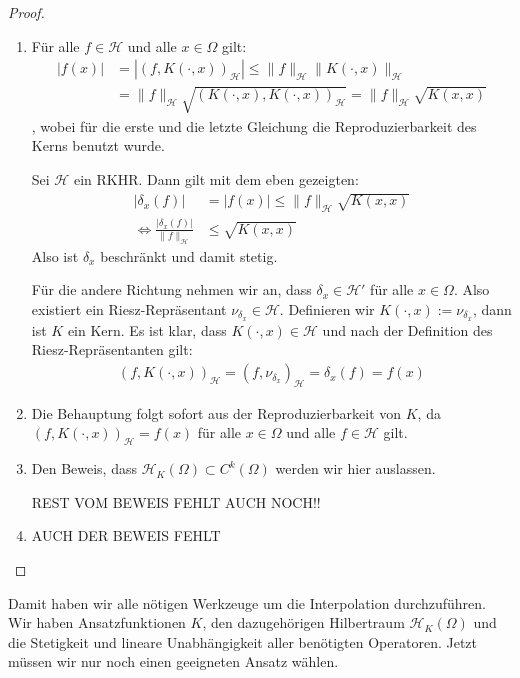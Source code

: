 \begin{proof}
\begin{enumerate}
\item Für alle $f \in \mathcal{H}$ und alle $x \in \Omega$ gilt:
\begin{align*}
|f(x)| &= |(f, K(\cdot,x))_\mathcal{H}| \le \|f\|_\mathcal{H}\|K(\cdot,x)\|_\mathcal{H}\\
&= \|f\|_\mathcal{H} \sqrt{(K(\cdot,x),K(\cdot,x))_\mathcal{H}} = \|f\|_\mathcal{H} \sqrt{K(x,x)}
\end{align*}
, wobei für die erste und die letzte Gleichung die Reproduzierbarkeit des Kerns benutzt wurde.

Sei $\mathcal{H}$ ein \ac{RKHR}. Dann gilt mit dem eben gezeigten:
\begin{align*}
|\delta_x(f)| &= |f(x)| \le \|f\|_\mathcal{H} \sqrt{K(x,x)}\\
\Leftrightarrow \frac{|\delta_x(f)|}{\|f\|_\mathcal{H}} &\le \sqrt{K(x,x)}
\end{align*}
Also ist $\delta_x$ beschränkt und damit stetig.

Für die andere Richtung nehmen wir an, dass $\delta_x  \in \mathcal{H}'$ für alle $x \in \Omega$. Also existiert ein Riesz-Repräsentant $\nu_{\delta_x} \in \mathcal{H}$. Definieren wir $K(\cdot,x):= \nu_{\delta_x}$, dann ist $K$ ein Kern. Es ist klar, dass $K(\cdot,x) \in \mathcal{H}$ und nach der Definition des Riesz-Repräsentanten gilt:
\begin{align*}
(f, K(\cdot,x))_\mathcal{H} = (f, \nu_{\delta_x})_\mathcal{H} = \delta_x(f) = f(x)
\end{align*}
\item Die Behauptung folgt sofort aus der Reproduzierbarkeit von $K$, da $(f, K(\cdot,x))_\mathcal{H}= f(x)$ für alle $x \in \Omega$ und alle $f \in \mathcal{H}$ gilt.
\item
Den Beweis, dass $\mathcal{H}_K(\Omega) \subset C^k(\Omega)$ werden wir hier auslassen.

REST VOM BEWEIS FEHLT AUCH NOCH!!
\item AUCH DER BEWEIS FEHLT
\end{enumerate}
\end{proof}

Damit haben wir alle nötigen Werkzeuge um die Interpolation durchzuführen. Wir haben Ansatzfunktionen $K$, den dazugehörigen Hilbertraum $\mathcal{H}_K(\Omega)$ und die Stetigkeit und lineare Unabhängigkeit aller benötigten Operatoren. Jetzt müssen wir nur noch einen geeigneten Ansatz wählen.
